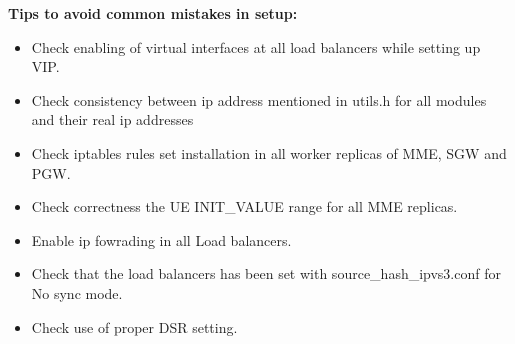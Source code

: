 \pdfminorversion=4\documentclass[hidelinks]{report}
\begin{document}
\noindent\textbf{Tips to avoid common mistakes in setup:}

\begin{itemize}
\item Check enabling of virtual interfaces at all load balancers while setting up VIP.
\item Check consistency between ip address mentioned in utils.h for all modules and their real ip addresses
\item Check iptables rules set installation in all worker replicas of MME, SGW and PGW.
\item Check correctness the UE INIT\_VALUE range for all MME replicas.
\item Enable ip fowrading in all Load balancers.
\item Check that the load balancers has been set with source\_hash\_ipvs3.conf for No sync mode.
\item Check use of proper DSR setting.
\end{itemize}
\end{document}
